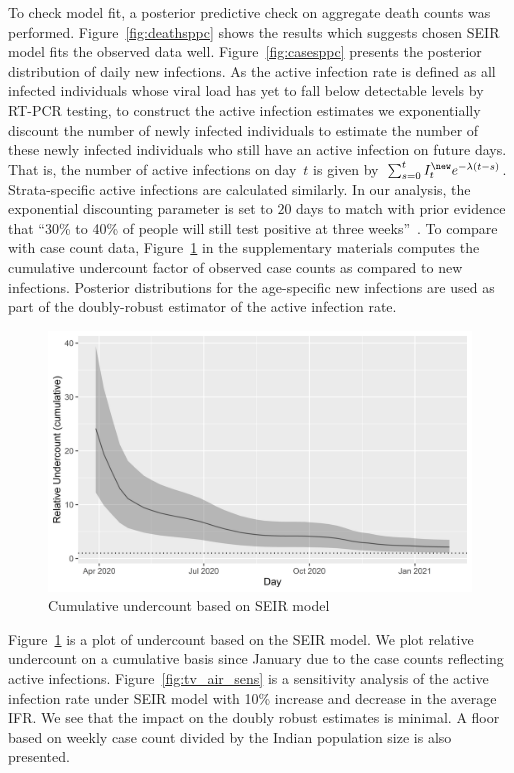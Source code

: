 \documentclass[11pt]{amsart}
\numberwithin{equation}{section}
\theoremstyle{plain}
\begin{document}
 To check model fit, a posterior predictive check on aggregate death counts was performed. Figure~\ref{fig:deathsppc} shows the results which suggests chosen SEIR model fits the observed data well. Figure~\ref{fig:casesppc} presents the posterior distribution of daily new infections. As the active infection rate is defined as all infected individuals whose viral load has yet to fall below detectable levels by RT-PCR testing, to construct the active infection estimates we exponentially discount the number of newly infected individuals to estimate the number of these newly infected individuals who still have an active infection on future days. That is, the number of active infections on day~$t$ is given by~$\sum_{s=0}^t I_t^{\new} e^{-\lambda (t-s)}$. Strata-specific active infections are calculated similarly. In our analysis, the exponential discounting parameter is set to $20$ days to match with prior evidence that ``30\% to 40\% of people will still test positive at three weeks''~\citep{wlocneg}. To compare with case count data, Figure~\ref{fig:undercounting} in the supplementary materials computes the cumulative undercount factor of observed case counts as compared to new infections.  Posterior distributions for the age-specific new infections are used as part of the doubly-robust estimator of the active infection rate.

\begin{figure}[!th]
 \centering
 \includegraphics[width=.6\linewidth]{../figs/cumulative_undercounting.png}
 \caption{Cumulative undercount based on SEIR model}
 \label{fig:undercounting}
\end{figure}

Figure~\ref{fig:undercounting} is a plot of undercount based on the SEIR model.  We plot relative undercount on a cumulative basis since January due to the case counts reflecting active infections. Figure~\ref{fig:tv_air_sens} is a sensitivity analysis of the active infection rate under SEIR model with 10\% increase and decrease in the average IFR.  We see that the impact on the doubly robust estimates is minimal.  A floor based on weekly case count divided by the Indian population size is also presented.
\end{document}
